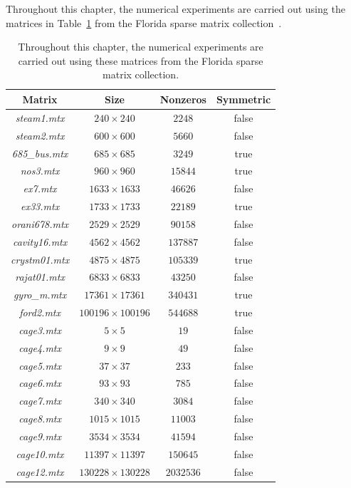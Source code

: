 \documentclass[12pt, twoside,a4paper,toc=bibliography]{scrbook}
\begin{document}
Throughout this chapter, the numerical experiments are carried out using
the matrices in Table~\ref{florida.mats} from the Florida sparse matrix collection~\cite{florida.matrices}.
\begin{table}
\centering
\begin{tabular}{|c|c|c|c|}
\hline
Matrix & Size & Nonzeros & Symmetric\\\hline
\textit{steam1.mtx} & $240\times 240$ & $2248$ & false\\\hline
\textit{steam2.mtx} & $600\times 600$ & $5660$ & false\\\hline
\textit{685\_bus.mtx} & $685\times 685$ & $3249$ & true\\\hline
\textit{nos3.mtx} & $960\times 960$ & $15844$ & true\\\hline
\textit{ex7.mtx} & $1633\times 1633$ & $46626$ & false\\\hline
\textit{ex33.mtx} & $1733\times 1733$ & $22189$ & true\\\hline
\textit{orani678.mtx} & $2529\times 2529$ & $90158$ & false\\\hline
\textit{cavity16.mtx} & $4562\times 4562$ & $137887$ & false\\\hline
\textit{crystm01.mtx} & $4875\times 4875$ & $105339$ & true\\\hline
\textit{rajat01.mtx} & $6833\times 6833$ & $43250$ & false\\\hline
\textit{gyro\_m.mtx} & $17361\times 17361$ & $340431$ & true\\\hline
\textit{ford2.mtx} & $100196\times 100196$ & $544688$ & true\\\hline
\textit{cage3.mtx} & $5\times 5$ & $19$ & false\\\hline
\textit{cage4.mtx} & $9\times 9$ & $49$ & false\\\hline
\textit{cage5.mtx} & $37\times 37$ & $233$ & false\\\hline
\textit{cage6.mtx} & $93\times 93$ & $785$ & false\\\hline
\textit{cage7.mtx} & $340\times 340$ & $3084$ & false\\\hline
\textit{cage8.mtx} & $1015\times 1015$ & $11003$ & false\\\hline
\textit{cage9.mtx} & $3534\times 3534$ & $41594$ & false\\\hline
\textit{cage10.mtx} & $11397\times 11397$ & $150645$ & false\\\hline
\textit{cage12.mtx} & $130228\times 130228$ & $2032536$ & false\\\hline
\end{tabular}
\caption{
Throughout this chapter, the numerical experiments are carried out using
these matrices from the Florida sparse matrix collection.}
\label{florida.mats}
\end{table}
\end{document}
